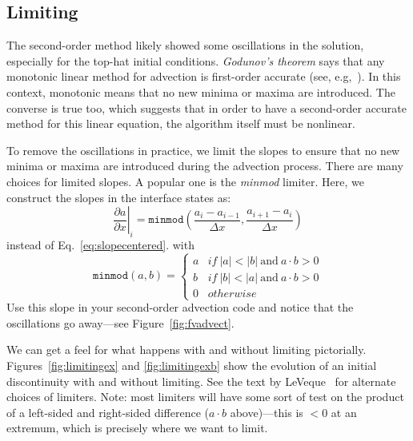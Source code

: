 \subsection{Limiting}

The second-order method likely showed some oscillations in the
solution, especially for the top-hat initial conditions.  {\em
  Godunov's theorem} says that any monotonic linear method for
advection is first-order accurate (see, e.g,~\cite{laney}).  In this
context, monotonic means that no new minima or maxima are introduced.
The converse is true too, which suggests that in order to have a
second-order accurate method for this linear equation, the algorithm
itself must be nonlinear.

\begin{exercise}
{To remove the oscillations in
practice, we limit the slopes to ensure that no new minima or maxima are
introduced during the advection process.  There are many choices for
limited slopes.  A popular one is the {\em minmod} limiter.  Here, we
construct the slopes in the interface states as:
\begin{equation}
\left . \frac{\partial a}{\partial x} \right |_i = \mathtt{minmod} \left (
  \frac{a_i - a_{i-1}}{\Delta x}, \frac{a_{i+1} - a_i}{\Delta x} \right )
\end{equation}
instead of Eq.~\ref{eq:slopecentered}.
with 
\begin{equation}
\mathtt{minmod}(a,b) = \left \{ 
    \begin{array}{ll}
    a & \mathit{if~} |a| < |b| \mathrm{~and~} a\cdot b > 0 \\
    b & \mathit{if~} |b| < |a| \mathrm{~and~} a\cdot b > 0 \\
    0 & \mathit{otherwise}
    \end{array}
  \right .
\end{equation}
Use this slope in your second-order advection code and notice that the
oscillations go away---see Figure~\ref{fig:fvadvect}.}
\end{exercise}

We can get a feel for what happens with and without limiting pictorially.
Figures~\ref{fig:limitingex} and \ref{fig:limitingexb} show the evolution
of an initial discontinuity with and without limiting.  See the text
by LeVeque~\cite{leveque:2002} for alternate choices of
limiters. Note: most limiters will have some sort of test on the product
of a left-sided and right-sided difference ($a\cdot
b$ above)---this is $< 0$ at an extremum, which is precisely where we want to
limit. 

